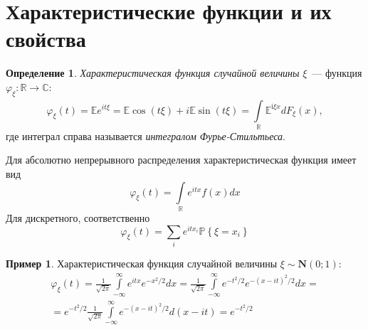 \documentclass[oneside,final,14pt]{extreport}
\theoremstyle{plain}
\theoremstyle{definition}
\newtheorem*{defn}{Определение}
\newtheorem*{exmp}{Пример}
\theoremstyle{named}
\begin{document}
\section{Характеристические функции и их свойства}
\begin{defn}
    {\it Характеристическая функция случайной величины} $\xi$~--- функция $\varphi_{\xi}: \mathbb{R} \rightarrow \mathbb{C}$:
    \begin{equation*}
        \varphi_{\xi}(t)
        = \mathbb{E} e^{i t \xi}
        = \mathbb{E} \cos (t \xi)+i \mathbb{E} \sin (t \xi) = \int\limits_{\mathbb{R}}^{} \mathbb{E}^{\mathrm{i} \xi x} d F_{\xi}(x),
    \end{equation*}
    где интеграл справа называется {\it интегралом Фурье-Стильтьеса}.
    
    Для абсолютно непрерывного распределения характеристическая функция имеет вид
    \begin{equation*}
        \varphi_{\xi}(t)=\int\limits_{\mathbb{R}} e^{i t x} f(x) d x
    \end{equation*}
    Для дискретного, соответственно
    \begin{equation*}
        \varphi_{\xi}(t)=\sum\limits_{i} e^{i t x_{i}} \mathbb{P}\left\{\xi=x_{i}\right\}
    \end{equation*}
\end{defn}

\begin{exmp}
    Характеристическая функция случайной величины $\xi \sim \mathbf{N}(0;1)$:
    \begin{multline*}
        \varphi_{\xi}(t) 
        = \frac{1}{\sqrt{2 \pi}} \int\limits_{-\infty}^{\infty} e^{i t x} e^{-x^{2} / 2} d x
        = \frac{1}{\sqrt{2 \pi}} \int\limits_{-\infty}^{\infty} e^{-t^{2} / 2} e^{-(x-i t)^{2} / 2} d x = \\ 
        = e^{-t^{2} / 2} \frac{1}{\sqrt{2 \pi}} \int\limits_{-\infty}^{\infty} e^{-(x-i t)^{2} / 2} d(x-i t)
        = e^{-t^{2} / 2}
    \end{multline*}
\end{exmp}
\end{document}
